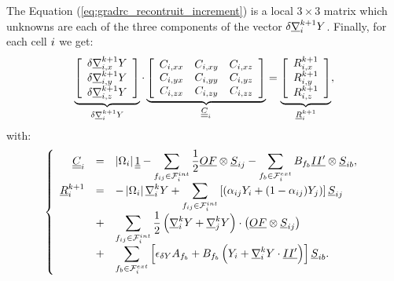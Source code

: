 The Equation (\ref{eq:gradrc_recontruit_increment}) is a local $3 \times 3$ matrix which unknowns are each of the three components of
the vector $\delta \underline{\nabla}_i^{k+1} Y$. Finally, for each cell $i$ we get:
%
\begin{equation}\label{eq:eq_systeme_matriciel_gradrc}
\underbrace{
\left[\begin{array}{c}
\delta \underline{\nabla}_{i ,x}^{k+1} Y\\
\delta \underline{\nabla}_{i ,y}^{k+1} Y\\
\delta \underline{\nabla}_{i ,z}^{k+1} Y
\end{array}\right]
}_{\delta \underline{\nabla}_i^{k+1} Y }
\cdot
\underbrace{
\left[\begin{array}{ccc}
\displaystyle
  C_{i , xx}
& C_{i , xy}
& C_{i , xz}\\
\displaystyle
  C_{i , yx}
& C_{i , yy}
& C_{i , yz}\\
\displaystyle
  C_{i , zx}
& C_{i , zy}
& C_{i , zz}
\end{array}\right]
}_{\underline{\underline{C}}_{i}}
=
\underbrace{
\left[\begin{array}{c}
\displaystyle
R^{k+1}_{i ,x}\\
\displaystyle
R^{k+1}_{i ,y}\\
\displaystyle
R^{k+1}_{i ,z}
\end{array}\right]
}_{\underline{R}^{k+1}_{i}} ,
\end{equation}
%
with:
%
\begin{equation}\label{eq:eq_second_membre_gradrc}
\left\{\begin{array}{rcl}
\underline{\underline{C}}_i  &=&
\displaystyle
\left| \Omega_{i} \right| \underline{\underline{1}} -
\sum\limits_{ {f_{ij}} \in \mathcal{F}^{int}_{i}} \frac{1}{2}  \underline{O F} \otimes \underline{S}_{{ij}} -
\sum\limits_{ {f_{b}} \in \mathcal{F}^{ext}_{i}} B_{{f_{b}}} \underline{I {I^\prime}}  \otimes \underline{S}_{{ib}} ,\\
\underline{R}^{k+1}_{i} &=&
\displaystyle
 -\left| \Omega_{i} \right|  \underline{\nabla}_{i}^{k} Y +
\sum\limits_{{f_{ij}} \in \mathcal{F}^{int}_{i}}\left[
(\alpha_{{ij}} Y_i + (1 - \alpha_{{ij}}) Y_j)\right] \underline{S}_{{ij}} \\
&+& \displaystyle
\sum\limits_{{f_{ij}} \in \mathcal{F}^{int}_{i}} \frac{1}{2}
\left(\underline{\nabla}_i^k Y + \underline{\nabla}_j^k Y \right) \cdot \left( \underline{O F} \otimes \underline{S}_{{ij}} \right) \\
&+& \displaystyle
\sum\limits_{{f_{b}} \in \mathcal{F}^{ext}_{i}}\left[ \epsilon_{\delta Y} A_{{f_{b}}}
+ B_{{f_{b}}} \left( Y_i + \underline{\nabla}_i^k Y \cdot \underline{I {I^\prime}} \right)  \right] \underline{S}_{{ib}} .
\end{array}\right.
\end{equation}

